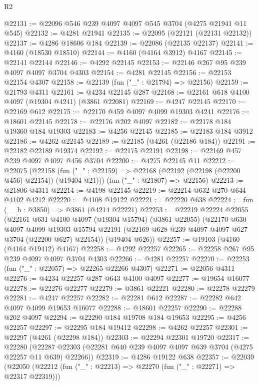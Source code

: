\begin{lexlean}{R2}
\begin{coremodule}
@22131 := @22096 @546 @239 @4097 @4097 @545 @3704 (@4275 @21941 @11 @545)
@22132 := @4281 @21941
@22135 := @22095 (@22121 (@22131 @22132))
@22137 := @4286 @18606 @184
@22139 := @22086 (@22135 @22137)
@22141 := @4160 (@18530 @18510)
@22144 := @4160 (@4164 @3912) @4167
@22145 := @22141 @22144
@22146 := @4292 @22145
@22153 := @22146 @267 @95 @239 @4097 @4097 @3704 @4303
@22154 := @4281 @22145
@22156 := @22153 @22154 @4307
@22158 := @22139 (fun ("_" : @21794) => @22156)
@22159 := @21793 @4311
@22161 := @4234 @22145 @287
@22168 := @22161 @618 @4100 @4097 (@19304 @4241) (@3861 @22081)
@22169 := @4247 @22145
@22170 := @22169 @612
@22175 := @22170 @459 @4097 @4099 @19303 @4241
@22176 := @18601 @22145
@22178 := @22176 @202 @4097
@22182 := @22178 @184 @19360 @184 @19303
@22183 := @4256 @22145
@22185 := @22183 @184 @3912
@22186 := @4262 @22145
@22189 := @22185 (@4261 (@22186 @184))
@22191 := @22182 @22189 @19374
@22192 := @22175 @22191
@22198 := @22169 @457 @239 @4097 @4097 @456 @3704
@22200 := @4275 @22145 @11
@22212 := @22075
    (@22158 (fun ("_" : @22159) => @22168 (@22192 (@22198 (@22200 @456) @22154)) (@19404 @21)))
    (fun ("_" : @21807) => @22156)
@22213 := @21806 @4311
@22214 := @4198 @22145
@22219 := @22214 @632 @270 @644 @4102 @4212
@22220 := @4108 @19122
@22221 := @22220 @638
@22224 := fun (__b : @3850) => @3861 (@4214 @22221)
@22253 := @22219
    @22224
    @22055
    (@22161
      @631
      @4100
      @4097
      (@19304 @15794)
      (@3861 @22055)
      (@22170
        @630
        @4097
        @4099
        @19303
        @15794
        @22191
        (@22169 @628 @239 @4097 @4097 @627 @3704 (@22200 @627) @22154))
      (@19404 @626))
@22257 := @19103 (@4160 (@4164 @19412) @4167)
@22258 := @4292 @22257
@22265 := @22258 @267 @95 @239 @4097 @4097 @3704 @4303
@22266 := @4281 @22257
@22270 := @22253 (fun ("_" : @22057) => @22265 @22266 @4307)
@22271 := @22056 @4311
@22276 := @4234 @22257 @287 @643 @4100 @4097
@22277 := @19654 @16077
@22278 := @22276 @22277
@22279 := @3861 @22221
@22280 := @22278 @22279
@22281 := @4247 @22257
@22282 := @22281 @612
@22287 := @22282 @642 @4097 @4099 @19653 @16077
@22288 := @18601 @22257
@22290 := @22288 @202 @4097
@22294 := @22290 @184 @19708 @184 @19653
@22295 := @4256 @22257
@22297 := @22295 @184 @19412
@22298 := @4262 @22257
@22301 := @22297 (@4261 (@22298 @184))
@22303 := @22294 @22301 @19720
@22317 := @22280
    (@22287 @22303 (@22281 @640 @239 @4097 @4097 @639 @3704 (@4275 @22257 @11 @639) @22266))
@22319 := @4286 @19122 @638
@22357 := @22039
    (@22050
      (@22212 (fun ("_" : @22213) => @22270 (fun ("_" : @22271) => @22317 @22319)))

\end{coremodule}
\end{lexlean}
